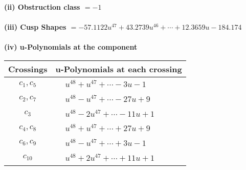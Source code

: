 \documentclass[1p]{elsarticle_modified}
\theoremstyle{definition}
\begin{document}
\flushleft \textbf{(ii) Obstruction class $= -1$}\\~\\
\flushleft \textbf{(iii) Cusp Shapes $= -57.1122 u^{47}+43.2739 u^{46}+\cdots+12.3659 u-184.174$}\\~\\
\newpage\renewcommand{\arraystretch}{1}
\flushleft \textbf{(iv) u-Polynomials at the component}\newline \\
\begin{tabular}{m{50pt}|m{274pt}}
Crossings & \hspace{64pt}u-Polynomials at each crossing \\
\hline $$\begin{aligned}c_{1},c_{5}\end{aligned}$$&$\begin{aligned}
&u^{48}+u^{47}+\cdots-3 u-1
\end{aligned}$\\
\hline $$\begin{aligned}c_{2},c_{7}\end{aligned}$$&$\begin{aligned}
&u^{48}- u^{47}+\cdots-27 u+9
\end{aligned}$\\
\hline $$\begin{aligned}c_{3}\end{aligned}$$&$\begin{aligned}
&u^{48}-2 u^{47}+\cdots-11 u+1
\end{aligned}$\\
\hline $$\begin{aligned}c_{4},c_{8}\end{aligned}$$&$\begin{aligned}
&u^{48}+u^{47}+\cdots+27 u+9
\end{aligned}$\\
\hline $$\begin{aligned}c_{6},c_{9}\end{aligned}$$&$\begin{aligned}
&u^{48}- u^{47}+\cdots+3 u-1
\end{aligned}$\\
\hline $$\begin{aligned}c_{10}\end{aligned}$$&$\begin{aligned}
&u^{48}+2 u^{47}+\cdots+11 u+1
\end{aligned}$\\
\hline
\end{tabular}\\~\\
\end{document}
